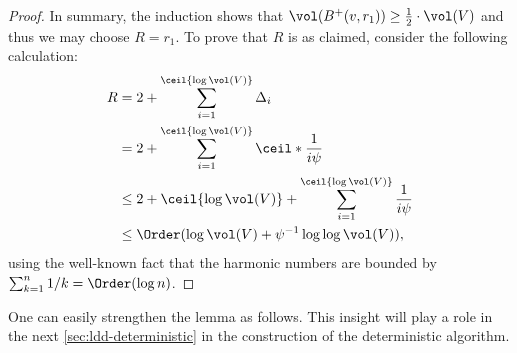 \begin{proof}
In summary, the induction shows that $\vol(B^+(v, r_1)) \geq \frac{1}{2} \cdot \vol(V)$ and thus we may choose $R = r_1$. To prove that $R$ is as claimed, consider the following calculation:
\begin{align*}
	R &= 2 + \sum_{i=1}^{\ceil{\log \vol(V)}} \Delta_i \\
	&= 2 + \sum_{i=1}^{\ceil{\log \vol(V)}} \ceil*{\frac{1}{i \psi}} \\
	&\leq 2 + \ceil{\log \vol(V)} + \sum_{i=1}^{\ceil{\log \vol(V)}} \frac{1}{i \psi} \\
	&\leq \Order(\log\vol(V) + \psi^{-1} \log\log\vol(V)),
\end{align*}
using the well-known fact that the harmonic numbers are bounded by $\sum_{k=1}^n 1/k = \Order(\log n)$.
\end{proof}

One can easily strengthen the lemma as follows. This insight will play a role in the next \cref{sec:ldd-deterministic} in the construction of the deterministic algorithm.

